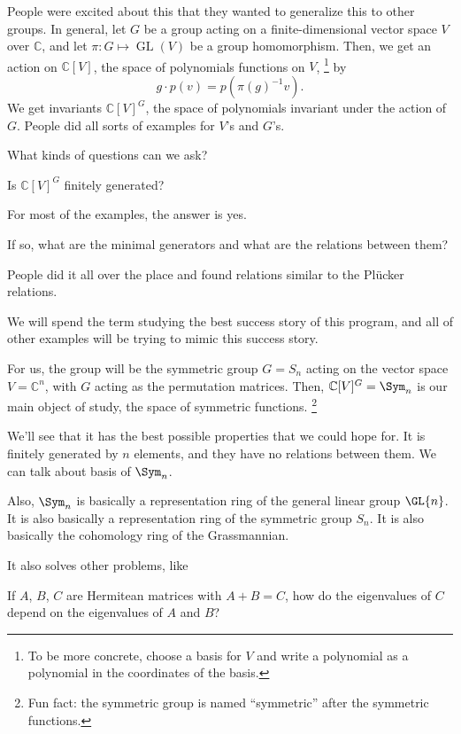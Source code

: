 People were excited about this that they wanted to generalize this to other groups.
In general, let \(G\) be a group acting on a finite-dimensional vector space \(V\) over \(\mathbb{C}\), and let \(\pi \colon G \mapsto \operatorname{GL}(V)\) be a group homomorphism.
Then, we get an action on \(\mathbb{C}[V]\), the space of polynomials functions on \(V\),%
\footnote{To be more concrete, choose a basis for \(V\) and write a polynomial as a polynomial in the coordinates of the basis.}
by 
\begin{equation*}
    g \cdot p(v) = p(\pi(g)^{-1}v).
\end{equation*}
We get invariants \(\mathbb{C}[V]^G\), the space of polynomials invariant under the action of \(G\).
People did all sorts of examples for \(V\)'s and \(G\)'s.

What kinds of questions can we ask?

\begin{question}
    Is \(\mathbb{C}[V]^G\) finitely generated?
\end{question}

For most of the examples, the answer is yes.

\begin{question}
    If so, what are the minimal generators and what are the relations between them?
\end{question}

People did it all over the place and found relations similar to the Plücker relations.

We will spend the term studying the best success story of this program,
and all of other examples will be trying to mimic this success story.

For us, the group will be the symmetric group \(G = S_n\) acting on the vector space \(V = \mathbb{C}^n\), with \(G\) acting as the permutation matrices.
Then, \(\mathbb{C}[V]^G = \Sym_n\) is our main object of study, the space of symmetric functions.%
\footnote{Fun fact: the symmetric group is named ``symmetric'' after the symmetric functions.}

We'll see that it has the best possible properties that we could hope for.
It is finitely generated by \(n\) elements, and they have no relations between them.
We can talk about basis of \(\Sym_n\).

Also, \(\Sym_n\) is basically a representation ring of the general linear group \(\GL{n}\).
It is also basically a representation ring of the symmetric group \(S_n\).
It is also basically the cohomology ring of the Grassmannian.

It also solves other problems, like
\begin{question}
    If \(A\), \(B\), \(C\) are Hermitean matrices
    with \(A + B = C\),
    how do the eigenvalues of \(C\) depend on the eigenvalues of \(A\) and \(B\)?
\end{question}